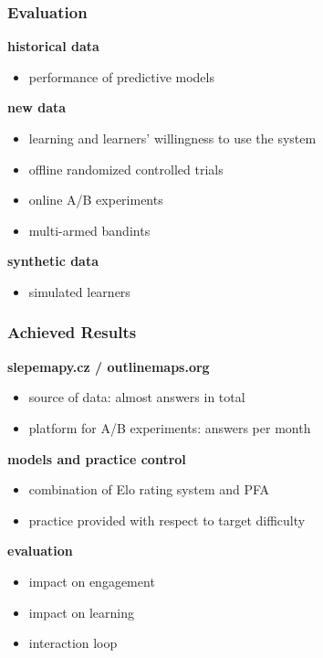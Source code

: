 \documentclass[xcolor=svgnames]{beamer}
\renewcommand{\cite}[1]{{\small\parencite{#1}}}
\begin{document}
\begin{frame}
	\frametitle{Evaluation}
	\textbf{historical data}
	\begin{itemize}
		\item performance of predictive models\\\cite{pelanek2014brief, huang2015framework}
	\end{itemize}
	\textbf{new data}
	\begin{itemize}
		\item learning and learners' willingness to use the system
		\item offline randomized controlled trials~\cite{dimitrov2003pretest}
		\item online A/B experiments~\cite{stamper2012rise}
		\item multi-armed bandints~\cite{liu2014trading}
	\end{itemize}
	\textbf{synthetic data}
	\begin{itemize}
		\item simulated learners~\cite{fancsali2013optimal}
	\end{itemize}
\end{frame}
\begin{frame}
	\frametitle{Achieved Results}
	\textbf{slepemapy.cz / outlinemaps.org}
	\begin{itemize}
		\item source of data: almost  answers in total
		\item platform for A/B experiments:  answers per month
	\end{itemize}
	\textbf{models and practice control}
	\begin{itemize}
		\item combination of Elo rating system and PFA
		\item practice provided with respect to target difficulty\\\cite{papousek2014adaptive}
	\end{itemize}
	\textbf{evaluation}
	\begin{itemize}
		\item impact on engagement~\cite{papousek2015impact}
		\item impact on learning~\cite{papousek2016evaluation}
		\item interaction loop~\cite{niznan2015exploring, pelanek2016impact}
	\end{itemize}
\end{frame}
\end{document}
